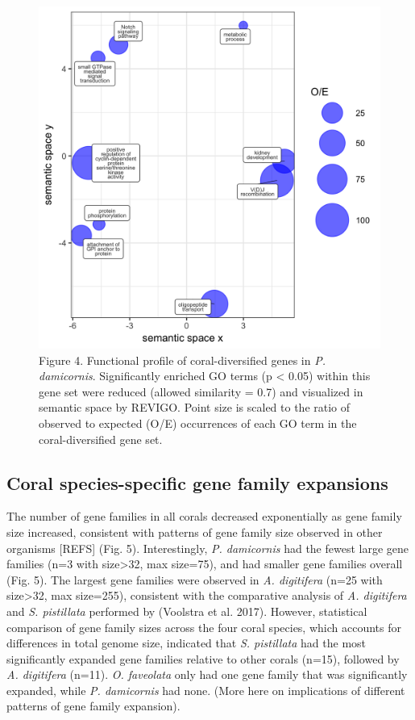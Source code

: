 \documentclass[]{elsarticle} %
\makeatletter
\def\maxwidth{\ifdim\Gin@nat@width>\linewidth\linewidth
\else\Gin@nat@width\fi}
\let\Oldincludegraphics\includegraphics
\renewcommand{\includegraphics}[1]{\Oldincludegraphics[width=\maxwidth]{#1}}
\makeatother
\begin{document}
\begin{figure}
\centering
\includegraphics{../coral_diversified/coral_diversified_enriched_revigo.png}
\caption{Figure 4. Functional profile of coral-diversified genes in
\emph{P. damicornis}. Significantly enriched GO terms (p \textless{}
0.05) within this gene set were reduced (allowed similarity = 0.7) and
visualized in semantic space by REVIGO. Point size is scaled to the
ratio of observed to expected (O/E) occurrences of each GO term in the
coral-diversified gene set.}
\end{figure}

\subsection{Coral species-specific gene family
expansions}\label{coral-species-specific-gene-family-expansions}

The number of gene families in all corals decreased exponentially as
gene family size increased, consistent with patterns of gene family size
observed in other organisms {[}REFS{]} (Fig. 5). Interestingly, \emph{P.
damicornis} had the fewest large gene families (n=3 with
size\textgreater{}32, max size=75), and had smaller gene families
overall (Fig. 5). The largest gene families were observed in \emph{A.
digitifera} (n=25 with size\textgreater{}32, max size=255), consistent
with the comparative analysis of \emph{A. digitifera} and \emph{S.
pistillata} performed by (Voolstra et al. 2017). However, statistical
comparison of gene family sizes across the four coral species, which
accounts for differences in total genome size, indicated that \emph{S.
pistillata} had the most significantly expanded gene families relative
to other corals (n=15), followed by \emph{A. digitifera} (n=11).
\emph{O. faveolata} only had one gene family that was significantly
expanded, while \emph{P. damicornis} had none. (More here on
implications of different patterns of gene family expansion).
\end{document}
